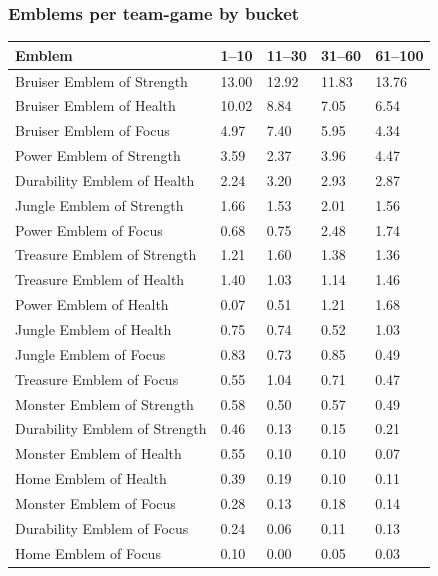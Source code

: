 \documentclass[
  10pt,
]{article}
\newcounter{none} %
\begin{document}
\subsubsection{Emblems per team-game by
bucket}\label{emblems-per-team-game-by-bucket-1}

{\def\LTcaptype{none} %
\begin{longtable}[]{@{}lllll@{}}
\toprule\noalign{}
Emblem & 1--10 & 11--30 & 31--60 & 61--100 \\
\midrule\noalign{}
\endhead
\bottomrule\noalign{}
\endlastfoot
Bruiser Emblem of Strength & 13.00 & 12.92 & 11.83 & 13.76 \\
Bruiser Emblem of Health & 10.02 & 8.84 & 7.05 & 6.54 \\
Bruiser Emblem of Focus & 4.97 & 7.40 & 5.95 & 4.34 \\
Power Emblem of Strength & 3.59 & 2.37 & 3.96 & 4.47 \\
Durability Emblem of Health & 2.24 & 3.20 & 2.93 & 2.87 \\
Jungle Emblem of Strength & 1.66 & 1.53 & 2.01 & 1.56 \\
Power Emblem of Focus & 0.68 & 0.75 & 2.48 & 1.74 \\
Treasure Emblem of Strength & 1.21 & 1.60 & 1.38 & 1.36 \\
Treasure Emblem of Health & 1.40 & 1.03 & 1.14 & 1.46 \\
Power Emblem of Health & 0.07 & 0.51 & 1.21 & 1.68 \\
Jungle Emblem of Health & 0.75 & 0.74 & 0.52 & 1.03 \\
Jungle Emblem of Focus & 0.83 & 0.73 & 0.85 & 0.49 \\
Treasure Emblem of Focus & 0.55 & 1.04 & 0.71 & 0.47 \\
Monster Emblem of Strength & 0.58 & 0.50 & 0.57 & 0.49 \\
Durability Emblem of Strength & 0.46 & 0.13 & 0.15 & 0.21 \\
Monster Emblem of Health & 0.55 & 0.10 & 0.10 & 0.07 \\
Home Emblem of Health & 0.39 & 0.19 & 0.10 & 0.11 \\
Monster Emblem of Focus & 0.28 & 0.13 & 0.18 & 0.14 \\
Durability Emblem of Focus & 0.24 & 0.06 & 0.11 & 0.13 \\
Home Emblem of Focus & 0.10 & 0.00 & 0.05 & 0.03 \\
\end{longtable}
}
\end{document}
